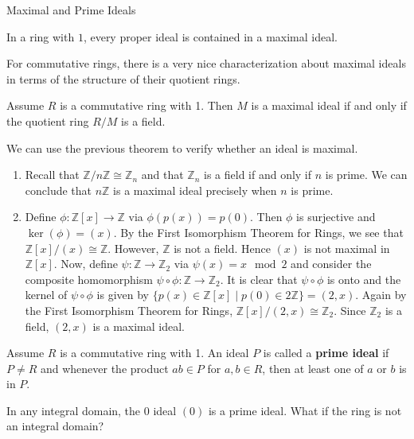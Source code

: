 \begin{section}{Maximal and Prime Ideals}
\begin{theorem}
In a ring with $1$, every proper ideal is contained in a maximal ideal.
\end{theorem}

For commutative rings, there is a very nice characterization about maximal ideals in terms of the structure of their quotient rings.

\begin{theorem}
Assume $R$ is a commutative ring with 1.  Then $M$ is a maximal ideal if and only if the quotient ring $R/M$ is a field.
\end{theorem}

\begin{example}
We can use the previous theorem to verify whether an ideal is maximal.
\begin{enumerate}[label=\rm{(\alph*)}]
\item Recall that $\mathbb{Z}/n\mathbb{Z}\cong \mathbb{Z}_n$ and that $\mathbb{Z}_n$ is a field if and only if $n$ is prime.  We can conclude that $n\mathbb{Z}$ is a maximal ideal precisely when $n$ is prime.
\item Define $\phi:\mathbb{Z}[x]\to\mathbb{Z}$ via $\phi(p(x))=p(0)$.  Then $\phi$ is surjective and $\ker(\phi)=(x)$.  By the First Isomorphism Theorem for Rings, we see that $\mathbb{Z}[x]/(x)\cong \mathbb{Z}$.  However, $\mathbb{Z}$ is not a field.  Hence $(x)$ is not maximal in $\mathbb{Z}[x]$.  Now, define $\psi:\mathbb{Z}\to\mathbb{Z}_2$ via $\psi(x)=x\mod 2$ and consider the composite homomorphism $\psi\circ\phi:\mathbb{Z}\to\mathbb{Z}_2$.    It is clear that $\psi\circ\phi$ is onto and the kernel of $\psi\circ\phi$ is given by $\{p(x)\in\mathbb{Z}[x]\mid p(0)\in 2\mathbb{Z}\}=(2,x)$. Again by the First Isomorphism Theorem for Rings, $\mathbb{Z}[x]/(2,x)\cong \mathbb{Z}_2$.  Since $\mathbb{Z}_2$ is a field, $(2,x)$ is a maximal ideal.
\end{enumerate}
\end{example}

\begin{definition}
Assume $R$ is a commutative ring with 1.  An ideal $P$ is called a \textbf{prime ideal} if $P\neq R$ and whenever the product $ab\in P$ for $a,b\in R$, then at least one of $a$ or $b$ is in $P$.
\end{definition}

\begin{example}
In any integral domain, the 0 ideal $(0)$ is a prime ideal. What if the ring is not an integral domain?
\end{example}


\end{section}
